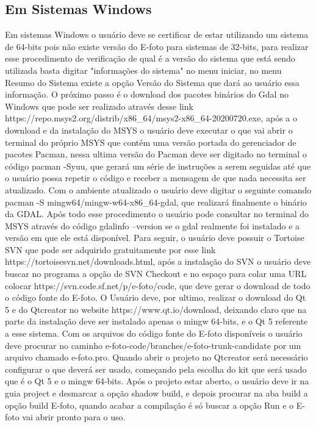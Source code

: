 \subsection{Em Sistemas Windows}

Em sistemas Windows o usuário deve se certificar de estar utilizando um sistema de 64-bits pois não existe versão do E-foto para sistemas de 32-bits, para realizar esse procedimento de verificação de qual é a versão do sistema que está sendo utilizada basta digitar "informações do sistema" no menu iniciar, no menu Resumo do Sistema existe a opção Versão do Sistema que dará ao usuário essa informação. O próximo passo é o download dos pacotes binários do Gdal no Windows que pode ser realizado através desse link https://repo.msys2.org/distrib/x86\_64/msys2-x86\_64-20200720.exe, %
  após a o download e da instalação do MSYS o usuário deve executar o que vai abrir o terminal do próprio MSYS que contém uma versão portada do gerenciador de pacotes Pacman, nessa ultima versão do Pacman deve ser digitado no terminal o código pacman -Syuu, que gerará um série de instruções a serem seguidas até que o usuário possa repetir o código e receber a mensagem de que nada necessita ser atualizado. Com o ambiente atualizado o usuário deve digitar o seguinte comando pacman -S mingw64/mingw-w64-x86\_64-gdal, que realizará finalmente o binário da GDAL. Após todo esse procedimento o usuário pode consultar no terminal do MSYS através do código gdalinfo --version se o gdal realmente foi instalado e a versão em que ele está disponível. Para seguir, o usuário deve possuir o Tortoise SVN que pode ser adquirido gratuitamente por esse link https://tortoisesvn.net/downloads.html, após a instalação do SVN o usuário deve buscar no programa a opção de SVN Checkout e no espaço para colar uma URL colocar https://svn.code.sf.net/p/e-foto/code, que deve gerar o download de todo o código fonte do E-foto. O Usuário deve, por ultimo, realizar o download do Qt 5 e do Qtcreator no website https://www.qt.io/download, deixando claro que na parte da instalação deve ser instalado apenas o mingw 64-bits, e o Qt 5 referente a esse sistema. Com os arquivos do código fonte do E-foto disponíveis o usuário deve procurar no caminho e-foto-code/branches/e-foto-trunk-candidate por um arquivo chamado e-foto.pro. Quando abrir o projeto no Qtcreator será necessário configurar o que deverá ser usado, começando pela escolha do kit que será usado que é o Qt 5 e o mingw 64-bits. Após o projeto estar aberto, o usuário deve ir na guia project e desmarcar a opção shadow build, e depois procurar na aba build a opção build E-foto, quando acabar a compilação é só buscar a opção Run e o E-foto vai abrir pronto para o uso.